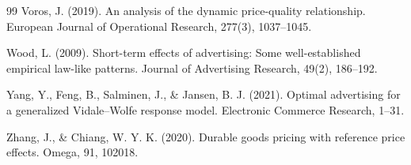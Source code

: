 \documentclass[]{interact}
\theoremstyle{plain}%
\theoremstyle{definition}
\theoremstyle{remark}
\begin{document}
\begin{thebibliography}{99}
Voros, J. (2019). An analysis of the dynamic price-quality relationship. European Journal of Operational Research, 277(3), 1037--1045.

Wood, L. (2009). Short-term effects of advertising: Some well-established empirical law-like patterns. Journal of Advertising Research, 49(2), 186--192.

Yang, Y., Feng, B., Salminen, J., \& Jansen, B. J. (2021). Optimal advertising for a generalized Vidale–Wolfe response model. Electronic Commerce Research, 1--31.

Zhang, J., \& Chiang, W. Y. K. (2020). Durable goods pricing with reference price effects. Omega, 91, 102018.



\end{thebibliography}
\end{document}
